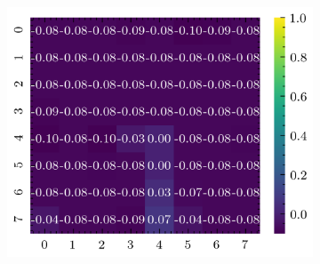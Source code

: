 \begin{figure}[H]
\begin{subfigure}[b]{0.19\textwidth}
        \includegraphics[width=\linewidth]{../img/5/quarry/false_positive/heatmap-2d-4.png}
    \end{subfigure}  


\end{figure}

